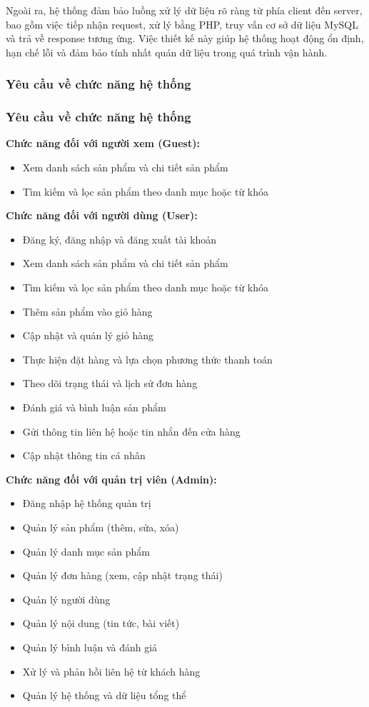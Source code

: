 \documentclass[pt = 12,a4paper]{article}
\begin{document}
\hspace{0.4cm} Ngoài ra, hệ thống đảm bảo luồng xử lý dữ liệu rõ ràng từ phía client đến server, bao gồm việc tiếp nhận request, xử lý bằng PHP, truy vấn cơ sở dữ liệu MySQL và trả về response tương ứng. Việc thiết kế này giúp hệ thống hoạt động ổn định, hạn chế lỗi và đảm bảo tính nhất quán dữ liệu trong quá trình vận hành.

\subsubsection{Yêu cầu về chức năng hệ thống}

\subsubsection{Yêu cầu về chức năng hệ thống}
\hspace{0.4cm} \textbf{Chức năng đối với người xem (Guest):}
\begin{itemize}
\item Xem danh sách sản phẩm và chi tiết sản phẩm
\item Tìm kiếm và lọc sản phẩm theo danh mục hoặc từ khóa
\end{itemize}

\hspace{0.4cm} \textbf{Chức năng đối với người dùng (User):}
\begin{itemize}
\item Đăng ký, đăng nhập và đăng xuất tài khoản
\item Xem danh sách sản phẩm và chi tiết sản phẩm
\item Tìm kiếm và lọc sản phẩm theo danh mục hoặc từ khóa
\item Thêm sản phẩm vào giỏ hàng
\item Cập nhật và quản lý giỏ hàng
\item Thực hiện đặt hàng và lựa chọn phương thức thanh toán
\item Theo dõi trạng thái và lịch sử đơn hàng
\item Đánh giá và bình luận sản phẩm
\item Gửi thông tin liên hệ hoặc tin nhắn đến cửa hàng
\item Cập nhật thông tin cá nhân
\end{itemize}

\hspace{0.4cm} \textbf{Chức năng đối với quản trị viên (Admin):}
\begin{itemize}
\item Đăng nhập hệ thống quản trị
\item Quản lý sản phẩm (thêm, sửa, xóa)
\item Quản lý danh mục sản phẩm
\item Quản lý đơn hàng (xem, cập nhật trạng thái)
\item Quản lý người dùng
\item Quản lý nội dung (tin tức, bài viết)
\item Quản lý bình luận và đánh giá
\item Xử lý và phản hồi liên hệ từ khách hàng
\item Quản lý hệ thống và dữ liệu tổng thể
\end{itemize}
\end{document}
